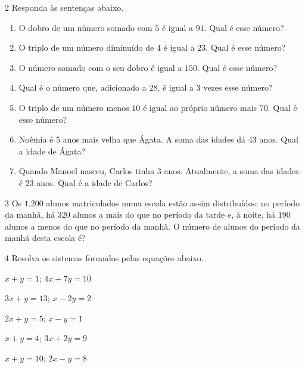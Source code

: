\num{2}  Responda às sentenças abaixo.

\begin{enumerate}\def\labelenumi{\alph{enumi})}
\item O dobro de um número somado com $5$ é igual a $91$. Qual é esse número? 
\item O triplo de um número diminuído de $4$ é igual a $23$. Qual é esse número? 
\item O número somado com o seu dobro é igual a $150$. Qual é esse número? 
\item Qual é o número que, adicionado a $28$, é igual a $3$ vezes esse número? 
\item O triplo de um número menos $10$ é igual ao próprio número mais $70$. Qual é esse número? 
\item Noêmia é $5$ anos mais velha que Ágata. A soma das idades dá $43$ anos. Qual a idade de Ágata? 
\item Quando Manoel nasceu, Carlos tinha $3$ anos. Atualmente, a soma das idades é $23$ anos. Qual é a idade de Carlos? 
\end{enumerate}

\num{3}  Os $1.200$ alunos matriculados numa escola estão assim distribuídos: no
período da manhã, há $320$ alunos a mais do que no período da tarde e, à
noite, há $190$ alunos a menos do que no período da manhã. O número de
alunos do período da manhã desta escola é?


\num{4}  Resolva os sistemas formados pelas equações abaixo.

\begin{escolha}
\item $x + y = 1$; $4x + 7y = 10$ 
\item $3x + y = 13$; $x - 2y = 2$ 
\item $2x + y = 5$; $x - y = 1$ 
\item $x + y = 4$; $3x + 2y = 9$ 
\item $x + y = 10$; $2x - y = 8$ 
\end{escolha}


